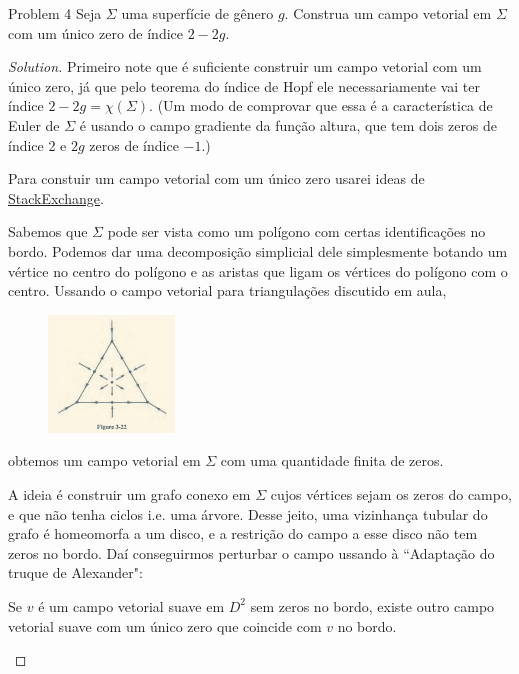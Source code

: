\begin{thing1}{Problem 4}\label{prob:4}\leavevmode
Seja \(\Sigma\) uma superfície de gênero \(g\). Construa um campo vetorial em \(\Sigma\) com um único zero de índice \(2-2g\).
\end{thing1}

\begin{proof}[Solution]\leavevmode
Primeiro note que é suficiente construir um campo vetorial com um único zero, já que pelo teorema do índice de Hopf ele necessariamente vai ter índice \(2-2g=\chi(\Sigma)\). (Um modo de comprovar que essa é a característica de Euler de \(\Sigma\) é usando o campo gradiente da função altura, que tem dois zeros de índice 2 e \(2g\) zeros de índice \(-1\).)

Para constuir um campo vetorial com um único zero usarei ideas de \href{https://math.stackexchange.com/questions/1453942/existence-of-a-vector-field-with-one-singularity-on-a-surface}{StackExchange}.

Sabemos que \(\Sigma\) pode ser vista como um polígono com certas identificações no bordo. Podemos dar uma decomposição simplicial dele simplesmente botando um vértice no centro do polígono e as aristas que ligam os vértices do polígono com o centro. Ussando o campo vetorial para triangulações discutido em aula,
\begin{figure}[H]
	\centering
	\includegraphics[width=0.3\textwidth]{fig1.png}
\end{figure}
obtemos um campo vetorial em \(\Sigma\) com uma quantidade finita de zeros.

A ideia é construir um grafo conexo em \(\Sigma\) cujos vértices sejam os zeros do campo, e que não tenha ciclos i.e. uma árvore. Desse jeito, uma vizinhança tubular do grafo é homeomorfa a um disco, e a restrição do campo a esse disco não tem zeros no bordo. Daí conseguirmos perturbar o campo ussando à ``Adaptação do truque de Alexander":

\begin{lemma}\leavevmode
Se \(v\) é um campo vetorial suave em \(D^2\) sem zeros no bordo, existe outro campo vetorial suave com um único zero que coincide com \(v\) no bordo.
\end{lemma}


\end{proof}
